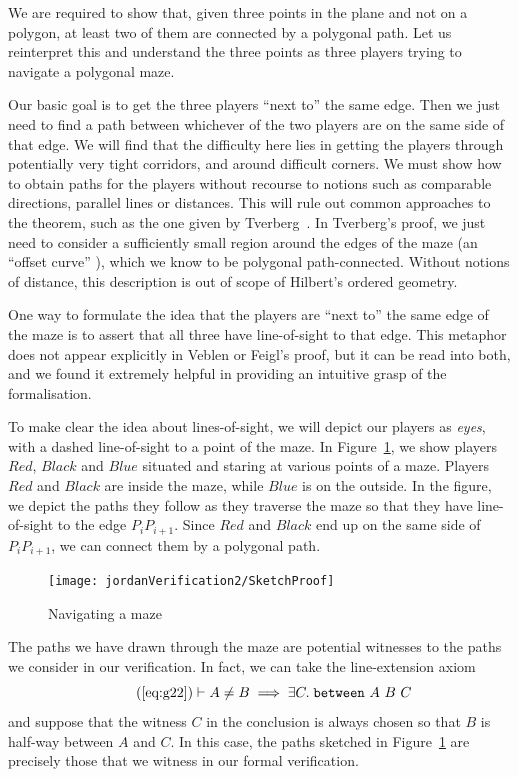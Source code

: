 We are required to show that, given three points in the plane and not on a polygon, at least two of them are connected by a polygonal path. Let us reinterpret this and understand the three points as three players trying to navigate a polygonal maze.

Our basic goal is to get the three players ``next to'' the same edge. Then we just need to find a path between whichever of the two players are on the same side of that edge. We will find that the difficulty here lies in getting the players through potentially very tight corridors, and around difficult corners. We must show how to obtain paths for the players without recourse to notions such as comparable directions, parallel lines or distances. This will rule out common approaches to the theorem, such as the one given by Tverberg~\cite{TverbergJordan}. In Tverberg's proof, we just need to consider a sufficiently small region around the edges of the maze (an ``offset curve'' ), which we know to be polygonal path-connected. Without notions of distance, this description is out of scope of Hilbert's ordered geometry.

One way to formulate the idea that the players are ``next to'' the same edge of the maze is to assert that all three have line-of-sight to that edge. This metaphor does not appear explicitly in Veblen or Feigl's proof, but it can be read into both, and we found it extremely helpful in providing an intuitive grasp of the formalisation.

To make clear the idea about lines-of-sight, we will depict our players as \emph{eyes}, with a dashed line-of-sight to a point of the maze. In Figure~\ref{fig:SketchProofJordan2}, we show players $Red$, $Black$ and $Blue$ situated and staring at various points of a maze. Players $Red$ and $Black$ are inside the maze, while $Blue$ is on the outside. In the figure, we depict the paths they follow as they traverse the maze so that they have line-of-sight to the edge $P_iP_{i+1}$. Since $Red$ and $Black$ end up on the same side of $P_iP_{i+1}$, we can connect them by a polygonal path.

\begin{figure}
  \centering\texttt{[image: jordanVerification2/SketchProof]}
  \caption{Navigating a maze}
  \label{fig:SketchProofJordan2}
\end{figure}

The paths we have drawn through the maze are potential witnesses to the paths we consider in our verification. In fact, we can take the line-extension axiom 
\begin{equation}
  \tag{\ref{eq:g22}}
  \vdash A \neq B \implies \exists C.\; \between{A}{B}{C}
\end{equation}
and suppose that the witness $C$ in the conclusion is always chosen so that $B$ is half-way between $A$ and $C$. In this case, the paths sketched in Figure~\ref{fig:SketchProofJordan2} are precisely those that we witness in our formal verification.


